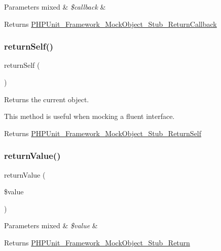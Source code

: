 \begin{DoxyParams}[1]{Parameters}
mixed & {\em \$callback} & \\
\hline
\end{DoxyParams}
\begin{DoxyReturn}{Returns}
\mbox{\hyperlink{class_p_h_p_unit___framework___mock_object___stub___return_callback}{P\+H\+P\+Unit\+\_\+\+Framework\+\_\+\+Mock\+Object\+\_\+\+Stub\+\_\+\+Return\+Callback}} 
\end{DoxyReturn}
\mbox{\label{_functions_8php_a90267a3fad433bb96e91c6b0c7d50a70}} 
\subsubsection{\texorpdfstring{return\+Self()}{returnSelf()}}
{\footnotesize\ttfamily return\+Self (\begin{DoxyParamCaption}{ }\end{DoxyParamCaption})}

Returns the current object.

This method is useful when mocking a fluent interface.

\begin{DoxyReturn}{Returns}
\mbox{\hyperlink{class_p_h_p_unit___framework___mock_object___stub___return_self}{P\+H\+P\+Unit\+\_\+\+Framework\+\_\+\+Mock\+Object\+\_\+\+Stub\+\_\+\+Return\+Self}} 
\end{DoxyReturn}
\mbox{\label{_functions_8php_abde2df1d4e6445dc0068e921223f2b48}} 
\subsubsection{\texorpdfstring{return\+Value()}{returnValue()}}
{\footnotesize\ttfamily return\+Value (\begin{DoxyParamCaption}\item[{}]{\$value }\end{DoxyParamCaption})}


\begin{DoxyParams}[1]{Parameters}
mixed & {\em \$value} & \\
\hline
\end{DoxyParams}
\begin{DoxyReturn}{Returns}
\mbox{\hyperlink{class_p_h_p_unit___framework___mock_object___stub___return}{P\+H\+P\+Unit\+\_\+\+Framework\+\_\+\+Mock\+Object\+\_\+\+Stub\+\_\+\+Return}} 
\end{DoxyReturn}
\mbox{\label{_functions_8php_a01296977f98af86b301ee52ed691d9fa}} 
